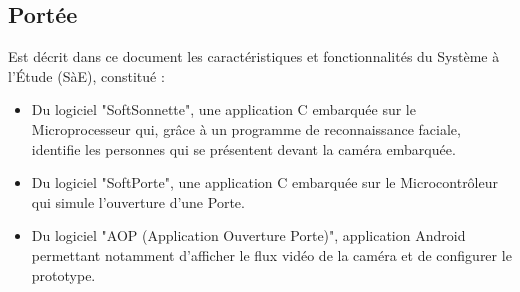 \subsection{Portée}

Est décrit dans ce document les caractéristiques et fonctionnalités du Système à l’Étude (SàE), constitué :
\begin{itemize}
    \item Du logiciel "SoftSonnette", une application C embarquée sur le Microprocesseur qui, grâce à un programme de reconnaissance faciale, identifie les personnes qui se présentent devant la caméra embarquée.

    \item Du logiciel "SoftPorte", une application C embarquée sur le Microcontrôleur qui simule l'ouverture d'une Porte.
 
    \item Du logiciel "AOP (Application Ouverture Porte)", application Android permettant notamment d'afficher le flux vidéo de la caméra et de configurer le prototype.
\end{itemize}
